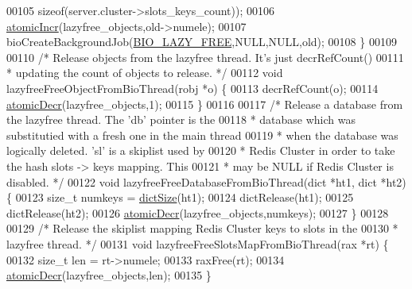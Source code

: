 \begin{DoxyCode}
00105            \textcolor{keyword}{sizeof}(server.cluster->slots\_keys\_count));
00106     \hyperlink{atomicvar_8h_acb57163a8c3d3c29f38ad239ef0a9c2d}{atomicIncr}(lazyfree\_objects,old->numele);
00107     bioCreateBackgroundJob(\hyperlink{bio_8h_afdc82658b2e29c63afcdb2e808b8a510}{BIO\_LAZY\_FREE},NULL,NULL,old);
00108 \}
00109 
00110 \textcolor{comment}{/* Release objects from the lazyfree thread. It's just decrRefCount()}
00111 \textcolor{comment}{ * updating the count of objects to release. */}
00112 \textcolor{keywordtype}{void} lazyfreeFreeObjectFromBioThread(robj *o) \{
00113     decrRefCount(o);
00114     \hyperlink{atomicvar_8h_ab416a5857f1cf1a6dee0310c39ea2036}{atomicDecr}(lazyfree\_objects,1);
00115 \}
00116 
00117 \textcolor{comment}{/* Release a database from the lazyfree thread. The 'db' pointer is the}
00118 \textcolor{comment}{ * database which was substitutied with a fresh one in the main thread}
00119 \textcolor{comment}{ * when the database was logically deleted. 'sl' is a skiplist used by}
00120 \textcolor{comment}{ * Redis Cluster in order to take the hash slots -> keys mapping. This}
00121 \textcolor{comment}{ * may be NULL if Redis Cluster is disabled. */}
00122 \textcolor{keywordtype}{void} lazyfreeFreeDatabaseFromBioThread(dict *ht1, dict *ht2) \{
00123     size\_t numkeys = \hyperlink{dict_8h_af193430dd3d5579a52b194512f72c1f0}{dictSize}(ht1);
00124     dictRelease(ht1);
00125     dictRelease(ht2);
00126     \hyperlink{atomicvar_8h_ab416a5857f1cf1a6dee0310c39ea2036}{atomicDecr}(lazyfree\_objects,numkeys);
00127 \}
00128 
00129 \textcolor{comment}{/* Release the skiplist mapping Redis Cluster keys to slots in the}
00130 \textcolor{comment}{ * lazyfree thread. */}
00131 \textcolor{keywordtype}{void} lazyfreeFreeSlotsMapFromBioThread(rax *rt) \{
00132     size\_t len = rt->numele;
00133     raxFree(rt);
00134     \hyperlink{atomicvar_8h_ab416a5857f1cf1a6dee0310c39ea2036}{atomicDecr}(lazyfree\_objects,len);
00135 \}
\end{DoxyCode}
